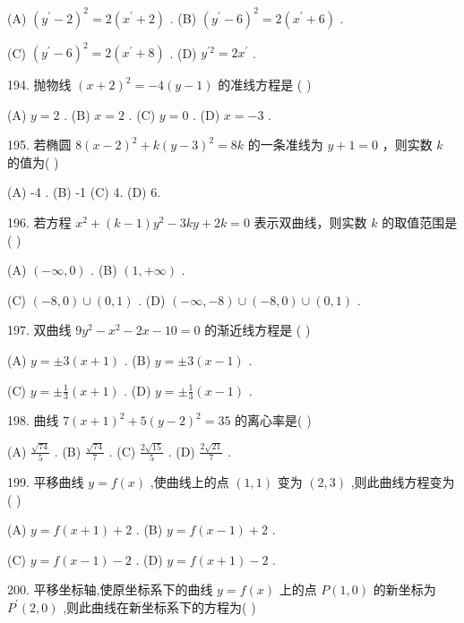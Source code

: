 \documentclass[10pt]{article}
\begin{document}
(A) \({\left( {y}^{\prime } - 2\right) }^{2} = 2\left( {{x}^{\prime } + 2}\right)\) . (B) \({\left( {y}^{\prime } - 6\right) }^{2} = 2\left( {{x}^{\prime } + 6}\right)\) .

(C) \({\left( {y}^{\prime } - 6\right) }^{2} = 2\left( {{x}^{\prime } + 8}\right)\) . (D) \({y}^{\prime 2} = 2{x}^{\prime }\) .

194. 抛物线 \({\left( x + 2\right) }^{2} =  - 4\left( {y - 1}\right)\) 的准线方程是 ( )

(A) \(y = 2\) . (B) \(x = 2\) . (C) \(y = 0\) . (D) \(x =  - 3\) .

195. 若椭圆 \(8{\left( x - 2\right) }^{2} + k{\left( y - 3\right) }^{2} = {8k}\) 的一条准线为 \(y + 1 = 0\) ，则实数 \(k\) 的值为( )

(A) -4 . (B) -1 (C) 4. (D) 6.

196. 若方程 \({x}^{2} + \left( {k - 1}\right) {y}^{2} - {3ky} + {2k} = 0\) 表示双曲线，则实数 \(k\) 的取值范围是( )

(A) \(\left( {-\infty ,0}\right)\) . (B) \(\left( {1, + \infty }\right)\) .

(C) \(\left( {-8,0}\right)  \cup  \left( {0,1}\right)\) . (D) \(\left( {-\infty , - 8}\right)  \cup  \left( {-8,0}\right)  \cup  \left( {0,1}\right)\) .

197. 双曲线 \(9{y}^{2} - {x}^{2} - {2x} - {10} = 0\) 的渐近线方程是 ( )

(A) \(y =  \pm  3\left( {x + 1}\right)\) . (B) \(y =  \pm  3\left( {x - 1}\right)\) .

(C) \(y =  \pm  \frac{1}{3}\left( {x + 1}\right)\) . (D) \(y =  \pm  \frac{1}{3}\left( {x - 1}\right)\) .

198. 曲线 \(7{\left( x + 1\right) }^{2} + 5{\left( y - 2\right) }^{2} = {35}\) 的离心率是( )

(A) \(\frac{\sqrt{74}}{5}\) . (B) \(\frac{\sqrt{74}}{7}\) . (C) \(\frac{2\sqrt{15}}{5}\) . (D) \(\frac{2\sqrt{21}}{7}\) .

199. 平移曲线 \(y = f\left( x\right)\) ,使曲线上的点 \(\left( {1,1}\right)\) 变为 \(\left( {2,3}\right)\) ,则此曲线方程变为 ( )

(A) \(y = f\left( {x + 1}\right)  + 2\) . (B) \(y = f\left( {x - 1}\right)  + 2\) .

(C) \(y = f\left( {x - 1}\right)  - 2\) . (D) \(y = f\left( {x + 1}\right)  - 2\) .

200. 平移坐标轴,使原坐标系下的曲线 \(y = f\left( x\right)\) 上的点 \(P\left( {1,0}\right)\) 的新坐标为 \({P}^{\prime }\left( {2,0}\right)\) ,则此曲线在新坐标系下的方程为( )
\end{document}
